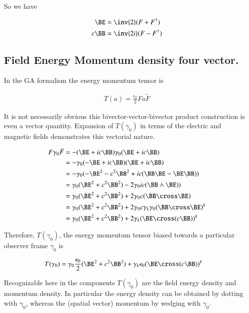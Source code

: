 So we have

\begin{align}\label{eqn:conjuagateSplit}
\BE &= \inv{2}(F + F^\dagger) \\
c \BB &= \inv{2i}(F - F^\dagger)
\end{align}

\subsection{ Field Energy Momentum density four vector.}

In the GA formalism the energy momentum tensor is

\begin{align}
T(a) = \frac{\epsilon_0}{2} F a \tilde{F}
\end{align}

It is not necessarily obvious this bivector-vector-bivector product construction is even a vector quantity.  Expansion of $T(\gamma_0)$ in terms of the electric and magnetic fields demonstrates this vectorial nature.

\begin{align*}
F \gamma_0 \tilde{F}
&=
-(\BE + i c \BB) \gamma_0 (\BE + i c \BB) \\
&=
-\gamma_0 (-\BE + i c \BB) (\BE + i c \BB) \\
&=
-\gamma_0 (-\BE^2 - c^2 \BB^2 + i c (\BB \BE - \BE \BB) ) \\
&=
\gamma_0 (\BE^2 + c^2 \BB^2) - 2 \gamma_0 i c (\BB \wedge \BE) ) \\
&=
\gamma_0 (\BE^2 + c^2 \BB^2) + 2 \gamma_0 c (\BB \cross \BE) \\
&=
\gamma_0 (\BE^2 + c^2 \BB^2) + 2 \gamma_0 c \gamma_k \gamma_0 (\BB \cross \BE)^k \\
&=
\gamma_0 (\BE^2 + c^2 \BB^2) + 2 \gamma_k (\BE \cross (c \BB))^k \\
\end{align*}

Therefore, $T(\gamma_0)$, the energy momentum tensor biased towards a particular observer frame $\gamma_0$
is

\begin{align}\label{eqn:emFourVect}
T(\gamma_0)
&=
\gamma_0 \frac{\epsilon_0}{2} (\BE^2 + c^2 \BB^2) + \gamma_k \epsilon_0 (\BE \cross (c \BB))^k
\end{align}

Recognizable here in the components $T(\gamma_0)$ are the field energy density and momentum density.  In particular the energy density can be obtained by dotting with $\gamma_0$, whereas the (spatial vector) momentum by wedging with $\gamma_0$.

